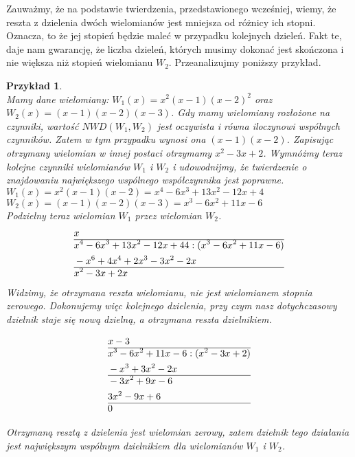 \documentclass[twoside,a4paper]{book}
\newtheorem{example}{Przykład}
\begin{document}
Zauważmy, że na podstawie twierdzenia, przedstawionego wcześniej, wiemy, że reszta z dzielenia dwóch wielomianów jest mniejsza od różnicy ich stopni. Oznacza, to że jej stopień będzie maleć w przypadku kolejnych dzieleń. Fakt te, daje nam gwarancję, że liczba dzieleń, których musimy dokonać jest skończona i nie większa niż stopień wielomianu $W_2$. Przeanalizujmy poniższy przykład.
\begin{example}
	$ $\\
	Mamy dane wielomiany: $W_1(x) = x^2(x-1)(x-2)^2$ oraz $W_2(x) = (x-1)(x-2)(x-3)$. Gdy mamy wielomiany rozłożone na czynniki, wartość $NWD(W_1, W_2)$ jest oczywista i równa iloczynowi wspólnych czynników. Zatem w tym przypadku wynosi ona $(x-1)(x-2)$. Zapisując otrzymany wielomian w innej postaci otrzymamy $x^2-3x+2$. Wymnóżmy teraz kolejne czynniki wielomianów $W_1$ i $W_2$ i udowodnijmy, że twierdzenie o znajdowaniu największego wspólnego współczynnika jest poprawne. \\
	$W_1(x) = x^2(x-1)(x-2) = x^4-6x^3+13x^2-12x+4$ \\
	$W_2(x) = (x-1)(x-2)(x-3) = x^3-6x^2+11x-6$ \\
	Podzielny teraz wielomian $W_1$ przez wielomian $W_2$. \\
	\begin{equation}
	\begin{split}
		&x\\\hline
		&x^4-6x^3+13x^2-12x+44 : (x^3-6x^2+11x-6) \\
		&-x^6+4x^4+2x^3-3x^2-2x \\\hline
		&x^2-3x+2x \\
	\end{split}
	\end{equation}
	Widzimy, że otrzymana reszta wielomianu, nie jest wielomianem stopnia zerowego. Dokonujemy więc kolejnego dzielenia, przy czym nasz dotychczasowy dzielnik staje się nową dzielną, a otrzymana reszta dzielnikiem.
	
	\begin{equation}
	\begin{split}
	&x-3\\\hline
	&x^3-6x^2+11x-6 : (x^2-3x+2) \\
	&-x^3+3x^2-2x \\\hline
	&-3x^2+9x-6 \\
	&3x^2-9x+6  \\\hline
	&0\\
	\end{split}
	\end{equation}
	
	Otrzymaną resztą z dzielenia jest wielomian zerowy, zatem dzielnik tego działania jest największym wspólnym dzielnikiem dla wielomianów $W_1$ i $W_2$.
\end{example}
\end{document}

